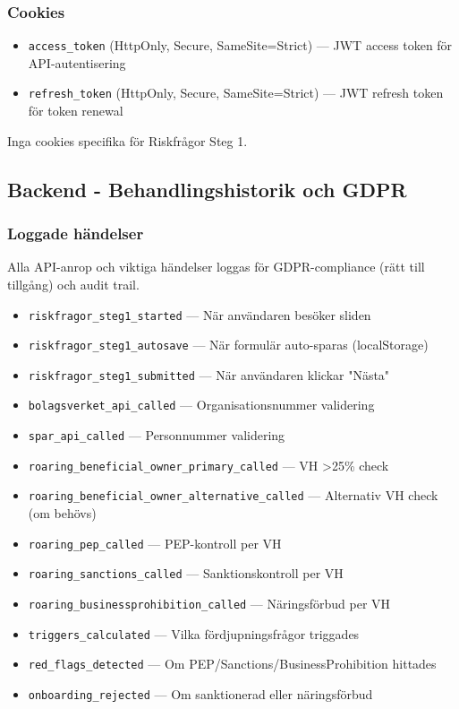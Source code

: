 \subsubsection{Cookies}

\begin{itemize}[noitemsep]
  \item \texttt{access\_token} (HttpOnly, Secure, SameSite=Strict) — JWT access token för API-autentisering
  \item \texttt{refresh\_token} (HttpOnly, Secure, SameSite=Strict) — JWT refresh token för token renewal
\end{itemize}

Inga cookies specifika för Riskfrågor Steg 1.

\subsection{Backend - Behandlingshistorik och GDPR}

\subsubsection{Loggade händelser}

Alla API-anrop och viktiga händelser loggas för GDPR-compliance (rätt till tillgång) och audit trail.

\begin{itemize}[noitemsep]
  \item \texttt{riskfragor\_steg1\_started} — När användaren besöker sliden
  \item \texttt{riskfragor\_steg1\_autosave} — När formulär auto-sparas (localStorage)
  \item \texttt{riskfragor\_steg1\_submitted} — När användaren klickar "Nästa"
  \item \texttt{bolagsverket\_api\_called} — Organisationsnummer validering
  \item \texttt{spar\_api\_called} — Personnummer validering
  \item \texttt{roaring\_beneficial\_owner\_primary\_called} — VH >25\% check
  \item \texttt{roaring\_beneficial\_owner\_alternative\_called} — Alternativ VH check (om behövs)
  \item \texttt{roaring\_pep\_called} — PEP-kontroll per VH
  \item \texttt{roaring\_sanctions\_called} — Sanktionskontroll per VH
  \item \texttt{roaring\_businessprohibition\_called} — Näringsförbud per VH
  \item \texttt{triggers\_calculated} — Vilka fördjupningsfrågor triggades
  \item \texttt{red\_flags\_detected} — Om PEP/Sanctions/BusinessProhibition hittades
  \item \texttt{onboarding\_rejected} — Om sanktionerad eller näringsförbud
\end{itemize}

